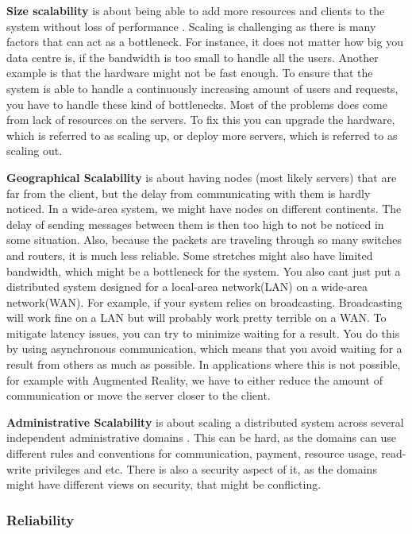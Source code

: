 \textbf{Size scalability} is about being able to add more resources and clients to the system without loss of performance \cite{steen_distributed_2017}. Scaling is challenging as there is many factors that can act as a bottleneck. For instance, it does not matter how big you data centre is, if the bandwidth  is too small to handle all the users. Another example is that the hardware might not be fast enough. To ensure that the system is able to handle a continuously increasing amount of users and requests, you have to handle these kind of bottlenecks. Most of the problems does come from lack of resources on the servers. To fix this you can upgrade the hardware, which is referred to as scaling up, or deploy more servers, which is referred to as scaling out.

\textbf{Geographical Scalability} is about having nodes (most likely servers) that are far from the client, but the delay from communicating with them is hardly noticed. In a wide-area system, we might have nodes on different continents. The delay of sending messages between them is then too high to not be noticed in some situation. Also, because the packets are traveling through so many switches and routers, it is much less reliable. Some stretches might also have limited bandwidth, which might be a bottleneck for the system. You also cant just put a distributed system designed for a local-area network(LAN) on a wide-area network(WAN). For example, if your system relies on broadcasting. Broadcasting will work fine on a LAN but will probably work pretty terrible on a WAN. To mitigate latency issues, you can try to minimize waiting for a result. You do this by using asynchronous communication, which means that you avoid waiting for a result from others as much as possible. In applications where this is not possible, for example with Augmented Reality, we have to either reduce the amount of communication or move the server closer to the client.

\textbf{Administrative Scalability} is about scaling a distributed system across several independent administrative domains \cite{steen_distributed_2017}. This can be hard, as the domains can use different rules and conventions for communication, payment, resource usage, read-write privileges and etc. There is also a security aspect of it, as the domains might have different views on security, that might be conflicting. 

\subsubsection{Reliability}
